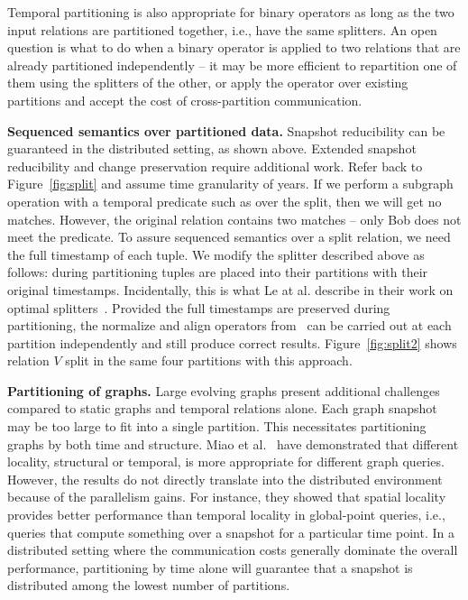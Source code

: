 Temporal partitioning is also appropriate for binary operators as long
as the two input relations are partitioned together, i.e., have the
same splitters.    An open question is what to do when a binary
operator is applied to two relations that are already partitioned
independently -- it may be more efficient to repartition one of them
using the splitters of the other, or apply the operator over existing
partitions and accept the cost of cross-partition communication.


{\bf Sequenced semantics over partitioned data.}  Snapshot
reducibility can be guaranteed in the distributed setting, as shown
above.  Extended snapshot reducibility and change preservation require
additional work.  Refer back to Figure~\ref{fig:split} and assume time
granularity of years.  If we perform a subgraph operation with a
temporal predicate such as  over the split, then we
will get no matches.  However, the original relation contains two
matches -- only Bob does not meet the
predicate.  To assure sequenced semantics over a split relation, we
need the full timestamp of each tuple.  We modify the splitter
described above as follows: during partitioning tuples are placed into
their partitions with their original timestamps.  Incidentally, this
is what Le at al. describe in their work on optimal
splitters~\cite{Le2013}.  Provided the full timestamps are preserved
during partitioning, the normalize and align operators
from~\cite{Dignos2012} can be carried out at each partition
independently and still produce correct results.
Figure~\ref{fig:split2} shows relation $V$ split in the same four
partitions with this approach.

{\bf Partitioning of graphs.}  Large evolving graphs present
additional challenges compared to static graphs and temporal relations
alone.  Each graph snapshot may be too large to fit into a single
partition.  This necessitates partitioning graphs by both time and
structure.  Miao et al.~\cite{Miao2015} have demonstrated that
different locality, structural or temporal, is more appropriate for
different graph queries.  However, the results do not directly
translate into the distributed environment because of the parallelism
gains.  For instance, they showed that spatial locality provides
better performance than temporal locality in global-point queries,
i.e., queries that compute something over a snapshot for a particular
time point.  In a distributed setting where the communication costs
generally dominate the overall performance, partitioning by time alone
will guarantee that a snapshot is distributed among the lowest number
of partitions.  

